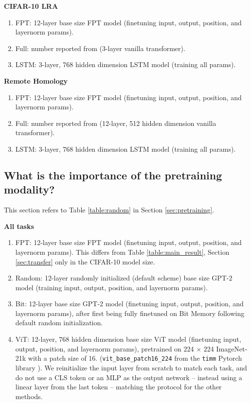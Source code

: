 \textbf{CIFAR-10 LRA}
\begin{enumerate}
    \item FPT: 12-layer base size FPT model (finetuning input, output, position, and layernorm params).
    \item Full: number reported from \cite{tay2020lra} (3-layer vanilla transformer).
    \item LSTM: 3-layer, 768 hidden dimension LSTM model (training all params).
\end{enumerate}

\textbf{Remote Homology}
\begin{enumerate}
    \item FPT: 12-layer base size FPT model (finetuning input, output, position, and layernorm params).
    \item Full: number reported from \cite{rap2019tape} (12-layer, 512 hidden dimension vanilla transformer).
    \item LSTM: 3-layer, 768 hidden dimension LSTM model (training all params).
\end{enumerate}
\vspace{2em}

\subsection{What is the importance of the pretraining modality?}
\label{app:details_pretraining}

This section refers to Table \ref{table:random} in Section \ref{sec:pretraining}.

\textbf{All tasks}
\begin{enumerate}
    \item FPT: 12-layer base size FPT model (finetuning input, output, position, and layernorm params). This differs from Table \ref{table:main_result}, Section \ref{sec:transfer} only in the CIFAR-10 model size.
    \item Random: 12-layer randomly initialized (default scheme) base size GPT-2 model (training input, output, position, and layernorm params).
    \item Bit: 12-layer base size GPT-2 model (finetuning input, output, position, and layernorm params), after first being fully finetuned on Bit Memory following default random initialization.
    \item ViT: 12-layer, 768 hidden dimension base size ViT model (finetuning input, output, position, and layernorm params), pretrained on 224 $\times$ 224 ImageNet-21k with a patch size of 16. (\texttt{vit\_base\_patch16\_224} from the \texttt{timm} Pytorch library \citep{wightman2019timm}).
    We reinitialize the input layer from scratch to match each task, and do not use a CLS token or an MLP as the output network -- instead using a linear layer from the last token -- matching the protocol for the other methods.
\end{enumerate}

